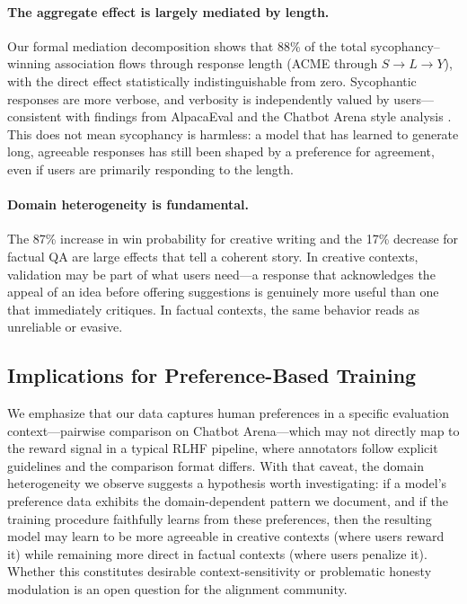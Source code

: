 \documentclass[11pt,twocolumn,a4paper]{article}
\begin{document}
\paragraph{The aggregate effect is largely mediated by length.}
Our formal mediation decomposition shows that 88\% of the total
sycophancy--winning association flows through response length (ACME
through $S \to L \to Y$), with the direct effect statistically
indistinguishable from zero. Sycophantic responses are more verbose,
and verbosity is independently valued by users---consistent with
findings from AlpacaEval \citep{dubois2024alpacafarm} and the Chatbot
Arena style analysis \citep{chiang2024chatbot}. This does not mean
sycophancy is harmless: a model that has learned to generate long,
agreeable responses has still been shaped by a preference for
agreement, even if users are primarily responding to the length.

\paragraph{Domain heterogeneity is fundamental.} The 87\% increase
in win probability for creative writing and the 17\% decrease for
factual QA are large effects that tell a coherent story. In creative
contexts, validation may be part of what users need---a response
that acknowledges the appeal of an idea before offering suggestions
is genuinely more useful than one that immediately critiques. In
factual contexts, the same behavior reads as unreliable or evasive.

\subsection{Implications for Preference-Based Training}

We emphasize that our data captures human preferences in a specific
evaluation context---pairwise comparison on Chatbot Arena---which may
not directly map to the reward signal in a typical RLHF pipeline,
where annotators follow explicit guidelines and the comparison format
differs. With that caveat, the domain heterogeneity we observe
suggests a hypothesis worth investigating: if a model's preference
data exhibits the domain-dependent pattern we document, and if the
training procedure faithfully learns from these preferences, then
the resulting model may learn to be more agreeable in creative
contexts (where users reward it) while remaining more direct in
factual contexts (where users penalize it). Whether this constitutes
desirable context-sensitivity or problematic honesty modulation is an
open question for the alignment community.
\end{document}
